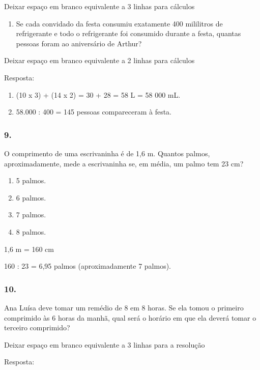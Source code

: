 \begin{enumerate}
\begin{escolha}
\begin{enumerate}
\begin{itemize}
\begin{itemize}
\begin{escolha}
Deixar espaço em branco equivalente a 3 linhas para cálculos

\begin{enumerate}
\def\labelenumi{\alph{enumi})}
\item
  Se cada convidado da festa consumiu exatamente 400 mililitros de refrigerante e
  todo o refrigerante foi consumido durante a festa, quantas pessoas
  foram ao aniversário de Arthur?
\end{enumerate}

Deixar espaço em branco equivalente a 2 linhas para cálculos

Resposta:

\begin{enumerate}
\def\labelenumi{\alph{enumi})}
\item
  (10 x 3) + (14 x 2) = 30 + 28 = 58 L = 58 000 mL.
\item
  58.000 : 400 = 145 pessoas compareceram à festa.
\end{enumerate}

\subsubsection{9.}\label{section-47}

O comprimento de uma escrivaninha é de 1,6 m. Quantos palmos,
aproximadamente, mede a escrivaninha se, em média, um palmo tem 23 cm?

\begin{enumerate}
\def\labelenumi{\alph{enumi})}
\item
  5 palmos.
\item
  6 palmos.
\item
  7 palmos.
\item
  8 palmos.
\end{enumerate}

1,6 m = 160 cm

160 : 23 = 6,95 palmos (aproximadamente 7 palmos).

\subsubsection{10.}\label{section-48}

Ana Luísa deve tomar um remédio de 8 em 8 horas. Se ela tomou o primeiro
comprimido às 6 horas da manhã, qual será o horário em que ela deverá tomar
o terceiro comprimido?

Deixar espaço em branco equivalente a 3 linhas para a resolução

Resposta:


\end{escolha}
\end{itemize}
\end{itemize}
\end{enumerate}
\end{escolha}
\end{enumerate}
